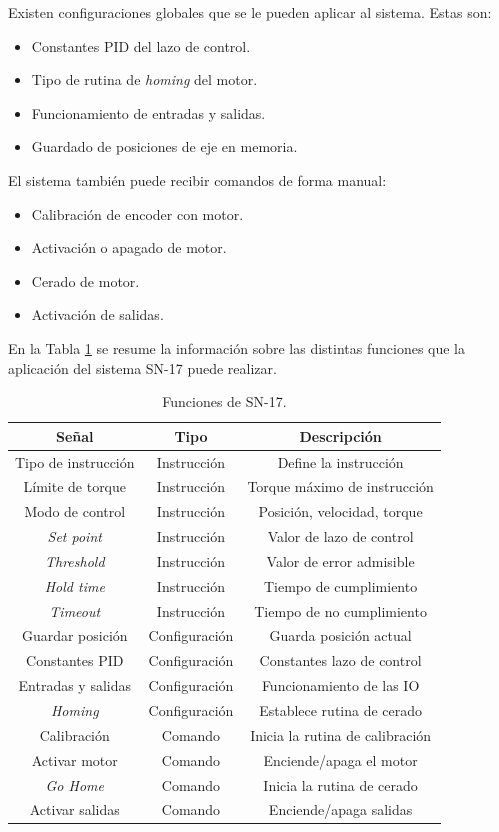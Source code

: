 Existen configuraciones globales que se le pueden aplicar al sistema. Estas son:
\begin{itemize}
	\item Constantes PID del lazo de control.
	\item Tipo de rutina de \textit{homing} del motor.
	\item Funcionamiento de entradas y salidas.
	\item Guardado de posiciones de eje en memoria.
\end{itemize}

El sistema también puede recibir comandos de forma manual:
\begin{itemize}
	\item Calibración de encoder con motor.
	\item Activación o apagado de motor.
	\item Cerado de motor.
	\item Activación de salidas.
\end{itemize}

En la Tabla \ref{tab:sn17_hoy} se resume la información sobre las distintas funciones que la aplicación del sistema SN-17 puede realizar.

\begin{table}[h]
	\centering
	\caption[Operaciones SN-17.]{Funciones de SN-17.}
	\begin{tabular}{c c c}    
		\toprule
		\textbf{Señal} 	 & \textbf{Tipo}  & \textbf{Descripción}\\
		\midrule
		Tipo de instrucción & Instrucción 	& Define la instrucción\\		
		Límite de torque 	& Instrucción	& Torque máximo de instrucción \\
		Modo de control		& Instrucción 	& Posición, velocidad, torque \\
		\textit{Set point}	& Instrucción 	& Valor de lazo de control \\
		\textit{Threshold}	& Instrucción 	& Valor de error admisible \\
		\textit{Hold time}	& Instrucción 	& Tiempo de cumplimiento \\
		\textit{Timeout}	& Instrucción 	& Tiempo de no cumplimiento \\
		Guardar posición	& Configuración & Guarda posición actual \\
		Constantes PID		& Configuración & Constantes lazo de control \\	
		Entradas y salidas	& Configuración & Funcionamiento de las IO \\
		\textit{Homing}		& Configuración & Establece rutina de cerado \\	
		Calibración			& Comando		& Inicia la rutina de calibración \\
		Activar motor		& Comando		& Enciende/apaga el motor \\
		\textit{Go Home}	& Comando		& Inicia la rutina de cerado \\
		Activar salidas		& Comando		& Enciende/apaga salidas \\	
		\bottomrule
		\hline
	\end{tabular}
	\label{tab:sn17_hoy}
\end{table}

